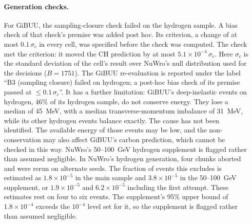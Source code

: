 \paragraph{Generation checks.} For GiBUU, the sampling-closure check failed on the hydrogen sample. A bias check of that check's premise was added post hoc. Its criterion, a change of at most $0.1\,\sigma_{c}$ in every cell, was specified before the check was computed. The check met the criterion: it moved the CH prediction by at most $5.1\times10^{-4}\,\sigma_{c}$. Here $\sigma_{c}$ is the standard deviation of the cell's result over NuWro's null distribution used for the decisions ($B=1751$). The GiBUU re-evaluation is reported under the label ``B3 (sampling closure) failed on hydrogen; a post-hoc bias check of its premise passed at $\le0.1\,\sigma_{c}$''. It has a further limitation: GiBUU's deep-inelastic events on hydrogen, 46\% of its hydrogen sample, do not conserve energy.  They lose a median of \SI{45}{MeV}, with a median transverse-momentum imbalance of \SI{31}{MeV}, while its other hydrogen events balance exactly. The cause has not been identified. The available energy of those events may be low, and the non-conservation may also affect GiBUU's carbon prediction, which cannot be checked in this way. NuWro's 50--\SI{100}{GeV} hydrogen supplement is flagged rather than assumed negligible. In NuWro's hydrogen generation, four chunks aborted and were rerun on alternate seeds. The fraction of events this excludes is estimated as $1.8\times10^{-5}$ in the main sample and $3.8\times10^{-5}$ in the 50--\SI{100}{GeV} supplement, or $1.9\times10^{-5}$ and $6.2\times10^{-5}$ including the first attempt. These estimates rest on four to six events.  The supplement's 95\% upper bound of $1.8\times10^{-4}$ exceeds the $10^{-4}$ level set for it, so the supplement is flagged rather than assumed negligible.
